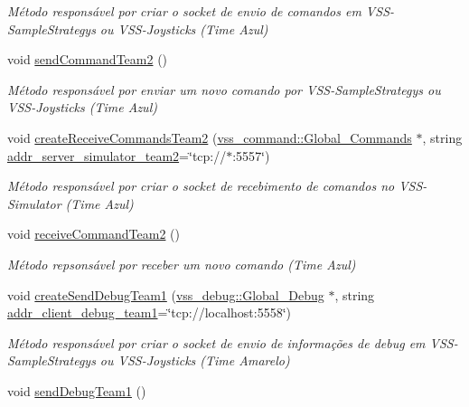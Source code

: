 \begin{DoxyCompactItemize}
\begin{DoxyCompactList}\small\item\em Método responsável por criar o socket de envio de comandos em V\+S\+S-\/\+Sample\+Strategys ou V\+S\+S-\/\+Joysticks (Time Azul) \end{DoxyCompactList}\item 
void \hyperlink{classInterface_a1c08d024eac24958a1a26d7045288895}{send\+Command\+Team2} ()
\begin{DoxyCompactList}\small\item\em Método responsável por enviar um novo comando por V\+S\+S-\/\+Sample\+Strategys ou V\+S\+S-\/\+Joysticks (Time Azul) \end{DoxyCompactList}\item 
void \hyperlink{classInterface_aac93c76a735e5bacc531472c09c72f07}{create\+Receive\+Commands\+Team2} (\hyperlink{classvss__command_1_1Global__Commands}{vss\+\_\+command\+::\+Global\+\_\+\+Commands} $\ast$, string \hyperlink{classInterface_a5bf42480628d97126c4ccf79dab80608}{addr\+\_\+server\+\_\+simulator\+\_\+team2}=\char`\"{}tcp\+://$\ast$\+:5557\char`\"{})
\begin{DoxyCompactList}\small\item\em Método responsável por criar o socket de recebimento de comandos no V\+S\+S-\/\+Simulator (Time Azul) \end{DoxyCompactList}\item 
void \hyperlink{classInterface_a47c447c89b29ab7e5a9eedc214e2e9cf}{receive\+Command\+Team2} ()
\begin{DoxyCompactList}\small\item\em Método repsonsável por receber um novo comando (Time Azul) \end{DoxyCompactList}\item 
void \hyperlink{classInterface_acf42608b368670e5f8015e343f093934}{create\+Send\+Debug\+Team1} (\hyperlink{classvss__debug_1_1Global__Debug}{vss\+\_\+debug\+::\+Global\+\_\+\+Debug} $\ast$, string \hyperlink{classInterface_a89e46fcba4c30138064e7dfa66520620}{addr\+\_\+client\+\_\+debug\+\_\+team1}=\char`\"{}tcp\+://localhost\+:5558\char`\"{})
\begin{DoxyCompactList}\small\item\em Método responsável por criar o socket de envio de informações de debug em V\+S\+S-\/\+Sample\+Strategys ou V\+S\+S-\/\+Joysticks (Time Amarelo) \end{DoxyCompactList}\item 
void \hyperlink{classInterface_ad3ca9b710198e8f152ceecba608f3ea1}{send\+Debug\+Team1} ()

\end{DoxyCompactItemize}
